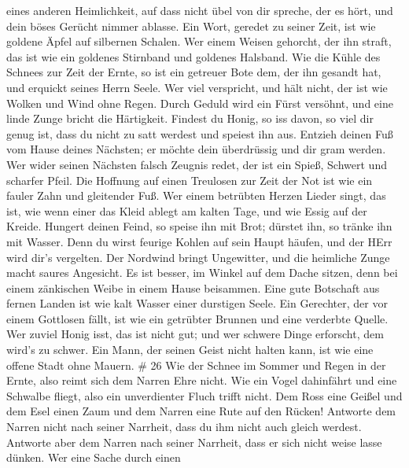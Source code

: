 eines anderen Heimlichkeit,  auf dass nicht übel von dir
spreche, der es hört, und dein böses Gerücht nimmer ablasse.
 Ein Wort, geredet zu seiner Zeit, ist wie goldene Äpfel
auf silbernen Schalen.  Wer einem Weisen gehorcht, der ihn
straft, das ist wie ein goldenes Stirnband und goldenes Halsband.
 Wie die Kühle des Schnees zur Zeit der Ernte, so ist ein
getreuer Bote dem, der ihn gesandt hat, und erquickt seines Herrn Seele.
 Wer viel verspricht, und hält nicht, der ist wie Wolken
und Wind ohne Regen.  Durch Geduld wird ein Fürst versöhnt,
und eine linde Zunge bricht die Härtigkeit.  Findest du
Honig, so iss davon, so viel dir genug ist, dass du nicht zu satt
werdest und speiest ihn aus.  Entzieh deinen Fuß vom Hause
deines Nächsten; er möchte dein überdrüssig und dir gram werden.
 Wer wider seinen Nächsten falsch Zeugnis redet, der ist
ein Spieß, Schwert und scharfer Pfeil.  Die Hoffnung auf
einen Treulosen zur Zeit der Not ist wie ein fauler Zahn und gleitender
Fuß.  Wer einem betrübten Herzen Lieder singt, das ist, wie
wenn einer das Kleid ablegt am kalten Tage, und wie Essig auf der
Kreide.  Hungert deinen Feind, so speise ihn mit Brot;
dürstet ihn, so tränke ihn mit Wasser.  Denn du wirst
feurige Kohlen auf sein Haupt häufen, und der HErr wird dir's vergelten.
 Der Nordwind bringt Ungewitter, und die heimliche Zunge
macht saures Angesicht.  Es ist besser, im Winkel auf dem
Dache sitzen, denn bei einem zänkischen Weibe in einem Hause beisammen.
 Eine gute Botschaft aus fernen Landen ist wie kalt Wasser
einer durstigen Seele.  Ein Gerechter, der vor einem
Gottlosen fällt, ist wie ein getrübter Brunnen und eine verderbte
Quelle.  Wer zuviel Honig isst, das ist nicht gut; und wer
schwere Dinge erforscht, dem wird's zu schwer.  Ein Mann,
der seinen Geist nicht halten kann, ist wie eine offene Stadt ohne
Mauern. \# 26  Wie der Schnee im Sommer und Regen in der
Ernte, also reimt sich dem Narren Ehre nicht.  Wie ein Vogel
dahinfährt und eine Schwalbe fliegt, also ein unverdienter Fluch trifft
nicht.  Dem Ross eine Geißel und dem Esel einen Zaum und dem
Narren eine Rute auf den Rücken!  Antworte dem Narren nicht
nach seiner Narrheit, dass du ihm nicht auch gleich werdest.
 Antworte aber dem Narren nach seiner Narrheit, dass er sich
nicht weise lasse dünken.  Wer eine Sache durch einen
